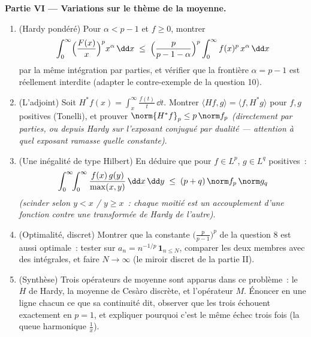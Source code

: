 \begin{problem}
\medskip
\noindent\textbf{Partie VI --- Variations sur le thème de
la moyenne.}
\begin{enumerate}[resume]
  \item (Hardy pondéré) Pour $\alpha < p - 1$ et $f \geq 0$,
        montrer
        \[
        \int_0^\infty\Bigl(\frac{F(x)}x\Bigr)^{p}
        x^{\alpha}\,\dd x \;\leq\;
        \Bigl(\frac{p}{p - 1 - \alpha}\Bigr)^{p}
        \int_0^\infty f(x)^p\,x^{\alpha}\,\dd x
        \]
        par la même intégration par parties, et vérifier
        que la frontière $\alpha = p - 1$ est réellement
        interdite (adapter le contre-exemple de la question
        10).
  \item (L'adjoint) Soit $H^*f(x) =
        \int_x^{\infty}\frac{f(t)}t\,\dd t$. Montrer
        $\langle Hf, g\rangle = \langle f, H^*g\rangle$
        pour $f, g$ positives (Tonelli), et prouver
        $\norm{H^*f}_p \leq p\,\norm f_p$ \emph{(directement
        par parties, ou depuis Hardy sur l'exposant
        conjugué par dualité --- attention à quel exposant
        ramasse quelle constante)}.
  \item (Une inégalité de type Hilbert) En déduire que pour
        $f \in L^p$, $g \in L^q$ positives~:
        \[
        \int_0^\infty\!\!\int_0^\infty
        \frac{f(x)\,g(y)}{\max(x,y)}\,\dd x\,\dd y
        \;\leq\; (p + q)\,\norm f_p\,\norm g_q
        \]
        \emph{(scinder selon $y < x$ / $y \geq x$~: chaque
        moitié est un accouplement d'une fonction contre
        une transformée de Hardy de l'autre)}.
  \item (Optimalité, discret) Montrer que la constante
        $\bigl(\frac p{p-1}\bigr)^p$ de la question 8 est
        aussi optimale~: tester sur $a_n = n^{-1/p}\,\mathbf
        1_{n \leq N}$, comparer les deux membres avec des
        intégrales, et faire $N \to \infty$ (le miroir
        discret de la partie II).
  \item (Synthèse) Trois opérateurs de moyenne sont
        apparus dans ce problème~: le $H$ de Hardy, la
        moyenne de Cesàro discrète, et l'opérateur 
        $M$. Énoncer en une ligne chacun ce que sa
        continuité dit, observer que les trois échouent
        exactement en $p = 1$, et expliquer pourquoi c'est
        le même échec trois fois (la queue harmonique
        $\frac1x$).
\end{enumerate}


\end{problem}
